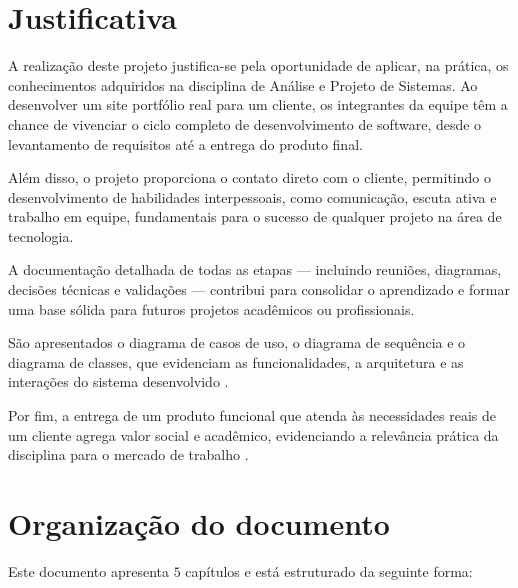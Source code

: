 \section{Justificativa}
\label{sec:justi}

A realização deste projeto justifica-se pela oportunidade de aplicar, na prática, os conhecimentos adquiridos na disciplina de Análise e Projeto de Sistemas. Ao desenvolver um site portfólio real para um cliente, os integrantes da equipe têm a chance de vivenciar o ciclo completo de desenvolvimento de software, desde o levantamento de requisitos até a entrega do produto final.

Além disso, o projeto proporciona o contato direto com o cliente, permitindo o desenvolvimento de habilidades interpessoais, como comunicação, escuta ativa e trabalho em equipe, fundamentais para o sucesso de qualquer projeto na área de tecnologia.

A documentação detalhada de todas as etapas — incluindo reuniões, diagramas, decisões técnicas e validações — contribui para consolidar o aprendizado e formar uma base sólida para futuros projetos acadêmicos ou profissionais.

São apresentados o diagrama de casos de uso, o diagrama de sequência e o diagrama de classes, que evidenciam as funcionalidades, a arquitetura e as interações do sistema desenvolvido \cite{Larman2007}.

Por fim, a entrega de um produto funcional que atenda às necessidades reais de um cliente agrega valor social e acadêmico, evidenciando a relevância prática da disciplina para o mercado de trabalho \cite{Pressman2016, Sommerville2011}.




\section{Organização do documento}
\label{section:organizacao}

Este documento apresenta $5$ capítulos e está estruturado da seguinte forma:

